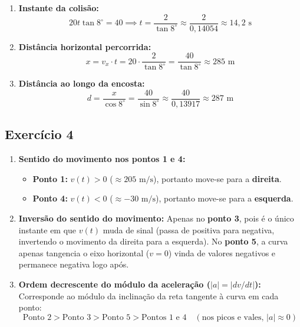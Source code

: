 \documentclass[11pt, a4paper]{article}
\begin{document}
\begin{enumerate}[label=\textbf{(\alph*)}]
    \item \textbf{Instante da colisão:}
    \[
        20t \tan 8^\circ = 40 \implies t = \frac{2}{\tan 8^\circ} \approx \frac{2}{0{,}14054} \approx 14{,}2\text{ s}
    \]

    \item \textbf{Distância horizontal percorrida:}
    \[
        x = v_x \cdot t = 20 \cdot \frac{2}{\tan 8^\circ} = \frac{40}{\tan 8^\circ} \approx 285\text{ m}
    \]

    \item \textbf{Distância ao longo da encosta:}
    \[
        d = \frac{x}{\cos 8^\circ} = \frac{40}{\sin 8^\circ} \approx \frac{40}{0{,}13917} \approx 287\text{ m}
    \]
\end{enumerate}

\subsection*{Exercício 4}
\begin{enumerate}[label=\textbf{(\alph*)}]
    \item \textbf{Sentido do movimento nos pontos 1 e 4:}
    \begin{itemize}
        \item \textbf{Ponto 1:} $v(t) > 0$ ($\approx 205\text{ m/s}$), portanto move-se para a \textbf{direita}.
        \item \textbf{Ponto 4:} $v(t) < 0$ ($\approx -30\text{ m/s}$), portanto move-se para a \textbf{esquerda}.
    \end{itemize}

    \item \textbf{Inversão do sentido do movimento:}
    Apenas no \textbf{ponto 3}, pois é o único instante em que $v(t)$ muda de sinal (passa de positiva para negativa, invertendo o movimento da direita para a esquerda). No \textbf{ponto 5}, a curva apenas tangencia o eixo horizontal ($v = 0$) vinda de valores negativos e permanece negativa logo após.

    \item \textbf{Ordem decrescente do módulo da aceleração ($|a| = |dv/dt|$):}
    Corresponde ao módulo da inclinação da reta tangente à curva em cada ponto:
    \[
        \text{Ponto 2} > \text{Ponto 3} > \text{Ponto 5} > \text{Pontos 1 e 4} \quad (\text{nos picos e vales, } |a| \approx 0)
    \]
\end{enumerate}
\end{document}
